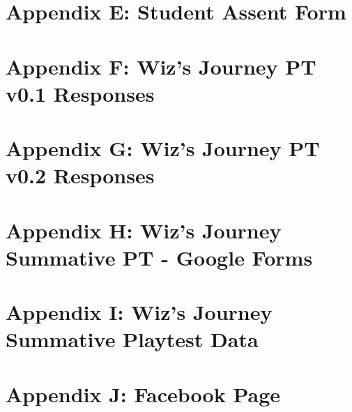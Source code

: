\documentclass[12pt,a4paper]{report}
\begin{document}
\section*{Appendix E: Student Assent Form}


\section*{Appendix F: Wiz's Journey PT v0.1 Responses}


\section*{Appendix G: Wiz's Journey PT v0.2 Responses}


\section*{Appendix H: Wiz's Journey Summative PT - Google Forms}


\section*{Appendix I: Wiz's Journey Summative Playtest Data}


\section*{Appendix J: Facebook Page}

\end{document}
